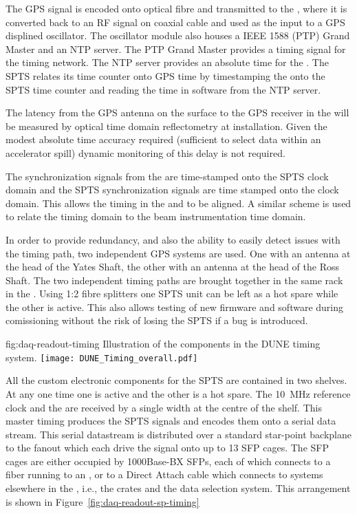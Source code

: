 The GPS signal is encoded onto optical fibre and transmitted to the
, where it is converted back to an RF signal on coaxial cable and
used as the input to a GPS displined oscillator. The oscillator module
also houses a IEEE 1588 (PTP) Grand Master and an NTP server. The PTP
Grand Master provides a timing signal for the  
timing network. The NTP server provides an absolute time for the
. The SPTS relates its time counter onto GPS time by
timestamping the  onto the SPTS time counter and reading
the time in software from the NTP server.

The latency from the GPS antenna on the surface to the GPS receiver in
the  will be measured by optical time domain reflectometry at
installation. Given the modest absolute time accuracy required
(sufficient to select data within an accelerator spill) dynamic
monitoring of this delay is not required.

The  synchronization signals from the   are
time-stamped onto the SPTS clock domain and the SPTS synchronization
signals are time stamped onto the  clock domain. This allows
the timing in the  and   to be
aligned. A similar scheme is used to relate the 
 timing domain to the beam instrumentation
 time domain.

In order to provide redundancy, and also the ability to easily detect
issues with the timing path, two independent GPS systems are used. One
with an antenna at the head of the Yates Shaft, the other with an
antenna at the head of the Ross Shaft. The two independent timing
paths are brought together in the same rack in the . Using 1:2
fibre splitters one SPTS unit can be left as a hot spare while the
other is active. This also allows testing of new firmware and software
during comissioning without the risk of losing the SPTS if a bug is
introduced.


\begin{dunefigure}{fig:daq-readout-timing}
  {Illustration of the components in the DUNE timing system.}
\texttt{[image: DUNE\_Timing\_overall.pdf]}
\end{dunefigure}

All the custom electronic components for the SPTS are contained in two
 shelves. At any one time one is active and the other is a
hot spare. The \SI{10}{\MHz} reference clock and the  are received
by a single width  at the centre of the  shelf. This
master timing  produces the SPTS signals and encodes them onto a
serial data stream. This serial datastream is distributed over a
standard star-point backplane to the fanout  which each drive the
signal onto up to \num{13} SFP cages. The SFP cages are either occupied by
1000Base-BX SFPs, each of which connects to a fiber running to an ,
or to a Direct Attach cable which connects to systems elsewhere in the
,  i.e., the  crates and the data selection system. This
arrangement is shown in Figure~\ref{fig:daq-readout-sp-timing}



